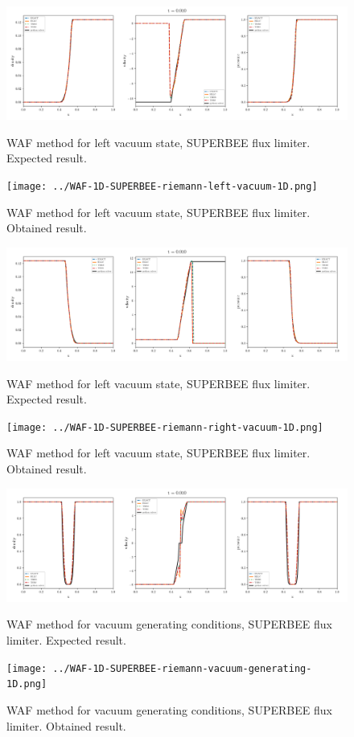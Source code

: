     \begin{figure}[htbp]
        \centering
        \includegraphics[width=.9\textwidth]{./figures/WAF-1D-SUPERBEE-riemann-left-vacuum-1D.png}%
        \caption{WAF method for left vacuum state, SUPERBEE flux limiter. Expected result.}
        \texttt{[image: ../WAF-1D-SUPERBEE-riemann-left-vacuum-1D.png]}
        \caption{WAF method for left vacuum state, SUPERBEE flux limiter. Obtained result.}
    \end{figure}


    \begin{figure}[htbp]
        \centering
        \includegraphics[width=.9\textwidth]{./figures/WAF-1D-SUPERBEE-riemann-right-vacuum-1D.png}%
        \caption{WAF method for left vacuum state, SUPERBEE flux limiter. Expected result.}
        \texttt{[image: ../WAF-1D-SUPERBEE-riemann-right-vacuum-1D.png]}
        \caption{WAF method for left vacuum state, SUPERBEE flux limiter. Obtained result.}
    \end{figure}


    \begin{figure}[htbp]
        \centering
        \includegraphics[width=.9\textwidth]{./figures/WAF-1D-SUPERBEE-riemann-vacuum-generating-1D.png}%
        \caption{WAF method for vacuum generating conditions, SUPERBEE flux limiter. Expected result.}
        \texttt{[image: ../WAF-1D-SUPERBEE-riemann-vacuum-generating-1D.png]}%
        \caption{WAF method for vacuum generating conditions, SUPERBEE flux limiter. Obtained result.}
    \end{figure}








